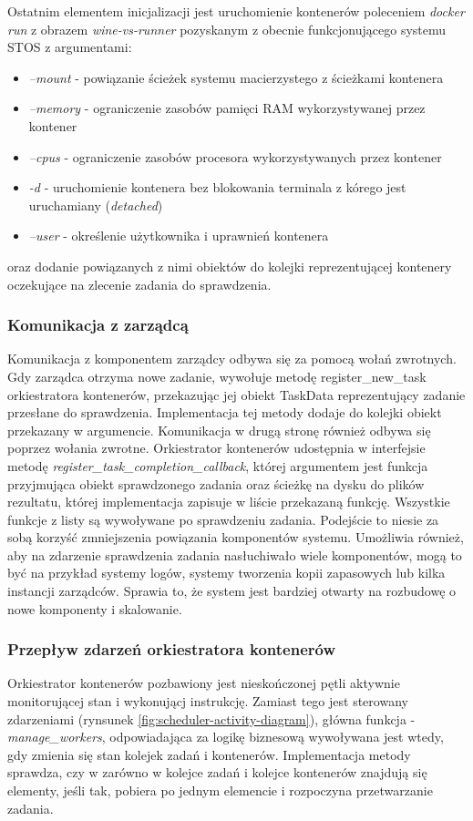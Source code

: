 Ostatnim elementem inicjalizacji jest uruchomienie kontenerów poleceniem \textit{docker run} z obrazem \textit{wine-vs-runner} pozyskanym z obecnie funkcjonującego systemu STOS z argumentami:
\begin{itemize}
    \item \textit{--mount} - powiązanie ścieżek systemu macierzystego z ścieżkami kontenera
    \item \textit{--memory} - ograniczenie zasobów pamięci RAM wykorzystywanej przez kontener
    \item \textit{--cpus} - ograniczenie zasobów procesora wykorzystywanych przez kontener
    \item \textit{-d} - uruchomienie kontenera bez blokowania terminala z kórego jest uruchamiany (\textit{detached})
    \item \textit{--user} - określenie użytkownika i uprawnień kontenera
\end{itemize}
oraz dodanie powiązanych z nimi obiektów do kolejki reprezentującej kontenery oczekujące na zlecenie zadania do sprawdzenia.

\subsubsection{Komunikacja z zarządcą}
Komunikacja z komponentem zarządcy odbywa się za pomocą wołań zwrotnych. Gdy zarządca otrzyma nowe zadanie, wywołuje metodę register\_new\_task orkiestratora kontenerów, przekazując jej obiekt TaskData reprezentujący zadanie przesłane do sprawdzenia. Implementacja tej metody dodaje do kolejki obiekt przekazany w argumencie. Komunikacja w drugą stronę również odbywa się poprzez wołania zwrotne. Orkiestrator kontenerów udostępnia w interfejsie metodę \textit{register\_task\_completion\_callback}, której argumentem jest funkcja przyjmująca obiekt sprawdzonego zadania oraz ścieżkę na dysku do plików rezultatu, której implementacja zapisuje w liście przekazaną funkcję. Wszystkie funkcje z listy są wywoływane po sprawdzeniu zadania. Podejście to niesie za sobą korzyść zmniejszenia powiązania komponentów systemu. Umożliwia również, aby na zdarzenie sprawdzenia zadania nasłuchiwało wiele komponentów, mogą to być na przykład systemy logów, systemy tworzenia kopii zapasowych lub kilka instancji zarządców. Sprawia to, że system jest bardziej otwarty na rozbudowę o nowe komponenty i skalowanie.

\subsubsection{Przepływ zdarzeń orkiestratora kontenerów}
Orkiestrator kontenerów pozbawiony jest nieskończonej pętli aktywnie monitorującej stan i wykonującj instrukcję. Zamiast tego jest sterowany zdarzeniami (rynsunek \ref{fig:scheduler-activity-diagram}), główna funkcja - \textit{manage\_workers}, odpowiadająca za logikę biznesową wywoływana jest wtedy, gdy zmienia się stan kolejek zadań i kontenerów. Implementacja metody sprawdza, czy w zarówno w kolejce zadań i kolejce kontenerów znajdują się elementy, jeśli tak, pobiera po jednym elemencie i rozpoczyna przetwarzanie zadania.

